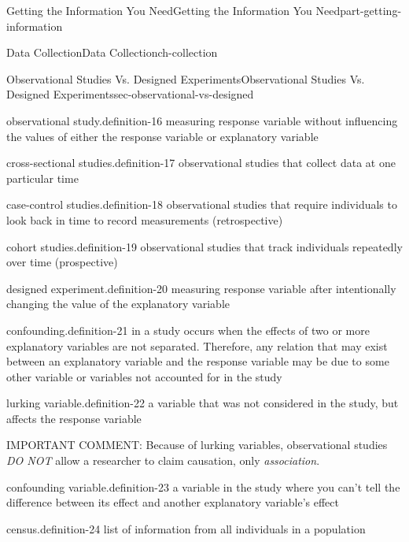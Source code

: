 \documentclass[oneside,10pt,]{book}
\numberwithin{equation}{section}
\begin{document}
\begin{partptx}{Getting the Information You Need}{}{Getting the Information You Need}{}{}{part-getting-information}
\begin{chapterptx}{Data Collection}{}{Data Collection}{}{}{ch-collection}
\begin{sectionptx}{Observational Studies Vs. Designed Experiments}{}{Observational Studies Vs. Designed Experiments}{}{}{sec-observational-vs-designed}
\begin{definition}{observational study.}{definition-16}%
measuring response variable without influencing the values of either the response variable or explanatory variable\end{definition}
\begin{definition}{cross-sectional studies.}{definition-17}%
observational studies that collect data at one particular time\end{definition}
\begin{definition}{case-control studies.}{definition-18}%
observational studies that require individuals to look back in time to record measurements (retrospective)\end{definition}
\begin{definition}{cohort studies.}{definition-19}%
observational studies that track individuals repeatedly over time (prospective)\end{definition}
\begin{definition}{designed experiment.}{definition-20}%
measuring response variable after intentionally changing the value of the explanatory variable\end{definition}
\begin{definition}{confounding.}{definition-21}%
in a study occurs when the effects of two or more explanatory variables are not separated. Therefore, any relation that may exist between an explanatory variable and the response variable may be due to some other variable or variables not accounted for in the study\end{definition}
\begin{definition}{lurking variable.}{definition-22}%
a variable that was not considered in the study, but affects the response variable\end{definition}
\hypertarget{p-6}{}%
IMPORTANT COMMENT: Because of lurking variables, observational studies \emph{DO NOT} allow a researcher to claim causation, only \emph{association}.%
\begin{definition}{confounding variable.}{definition-23}%
a variable in the study where you can’t tell the difference between its effect and another explanatory variable’s effect\end{definition}
\begin{definition}{census.}{definition-24}%
list of information from all individuals in a population\end{definition}
%
%
\typeout{************************************************}

\end{sectionptx}
\end{chapterptx}
\end{partptx}
\end{document}
